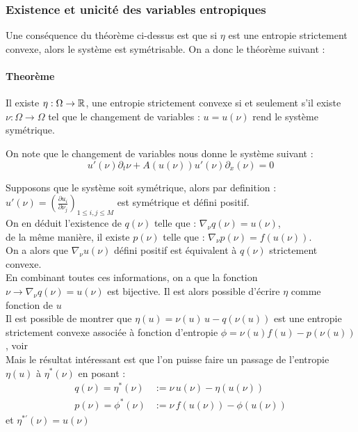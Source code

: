 \subsubsection{Existence et unicité des variables entropiques}
Une conséquence du théorème ci-dessus est que si $\eta$ est une entropie strictement convexe, alors le système est symétrisable.
On a donc le théorème suivant : 

\paragraph{Theorème}
Il existe $ \eta :\Omega \to \mathbb{R}$, une entropie strictement convexe si et seulement s'il existe $\nu : \Omega \to \Omega$ tel que le changement de variables : $u = u(\nu)$ rend le système symétrique.

On note que le changement de variables nous donne le système suivant : 
$$u'(\nu) \partial_t \nu + A(u(\nu)) u'(\nu) \partial_x(\nu) = 0 $$

Supposons que le système soit symétrique, alors par definition : $u'(\nu) = (\frac{\partial u_i}{\partial \nu_j})_{1\leq i,j \leq M} $  est symétrique et défini positif.\\
On en déduit l'existence de $q(\nu)$ telle que : $\nabla_\nu q(\nu) = u(\nu)$, \\
de la même manière, il existe $ p(\nu)$ telle que : $\nabla_\nu p(\nu) = f(u(\nu))$.\\
On a alors que $\nabla_\nu u(\nu)$ défini positif est équivalent à $q(\nu)$ strictement convexe.\\

En combinant toutes ces informations, on a que la fonction $\nu \to \nabla_\nu q(\nu) = u(\nu)$ est bijective. Il est alors possible d'écrire $\eta$ comme fonction de $u$\\
Il est possible de montrer que $\eta(u) = \nu(u) \, u - q(\nu(u))$ est une entropie strictement convexe associée à fonction d'entropie $\phi = \nu(u) f(u) - p(\nu(u))$, voir \cite{godlewski2021numerical}\\

Mais le résultat intéressant est que l'on puisse faire un passage de l'entropie $\eta(u)$ à $\eta^*(\nu)$ en posant : 
\begin{align}
    q(\nu) = \eta^*(\nu) &:= \nu \, u(\nu)   - \eta(u(\nu))\\
    p(\nu) = \phi^*(\nu) &:=\nu \, f(u(\nu)) - \phi(u(\nu))
\end{align} 
et $\eta^{*'}(\nu) = u(\nu)$ 